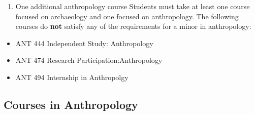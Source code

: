 \documentclass[
  letterpaper,
]{scrbook}
\providecommand{\tightlist}{%
  \setlength{\itemsep}{0pt}\setlength{\parskip}{0pt}}
\begin{document}
\begin{enumerate}
\def\labelenumi{\arabic{enumi}.}
\setcounter{enumi}{5}
\tightlist
\item
  One additional anthropology course Students must take at least one
  course focused on archaeology and one focused on anthropology. The
  following courses do \textbf{not} satisfy any of the requirements for
  a minor in anthropology:
\end{enumerate}

\begin{itemize}
\tightlist
\item
  ANT 444 Independent Study: Anthropology
\item
  ANT 474 Research Participation:Anthropology
\item
  ANT 494 Internship in Anthropolgy
\end{itemize}

\subsection{Courses in Anthropology}\label{courses-in-anthropology}
\end{document}
